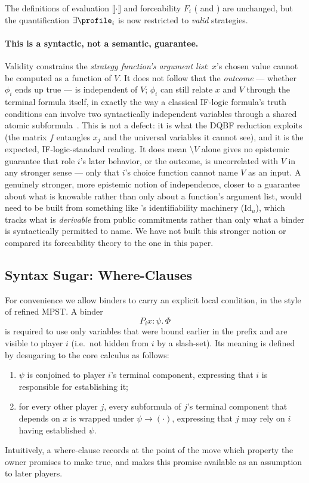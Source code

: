 The definitions of evaluation $\llbracket\cdot\rrbracket$ and forceability $F_i$
( and )
are unchanged, but the quantification $\exists \profile_i$
is now restricted to \emph{valid} strategies.

\paragraph{This is a syntactic, not a semantic, guarantee.}
Validity constrains the \emph{strategy function's argument list}: $x$'s
chosen value cannot be computed as a function of $V$. It does not follow
that the \emph{outcome} --- whether $\phi_i$ ends up true --- is independent
of $V$; $\phi_i$ can still relate $x$ and $V$ through the terminal formula
itself, in exactly the way a classical IF-logic formula's truth conditions
can involve two syntactically independent variables through a shared atomic
subformula~\cite{sep-logic-if}. This is not a defect: it is what the
 DQBF reduction exploits (the matrix $f$ entangles
$x_j$ and the universal variables it cannot see), and it is the expected,
IF-logic-standard reading. It does mean $\setminus V$ alone gives no
epistemic guarantee that role $i$'s later behavior, or the outcome, is
uncorrelated with $V$ in any stronger sense --- only that $i$'s choice
function cannot name $V$ as an input. A genuinely stronger, more
epistemic notion of independence, closer to a guarantee about what is
knowable rather than only about a function's argument list, would need to be
built from something like 's identifiability
machinery ($\mathrm{Id}_u$), which tracks what is \emph{derivable} from
public commitments rather than only what a binder is syntactically permitted
to name. We have not built this stronger notion or compared its forceability
theory to the one in this paper.

\subsection{Syntax Sugar: Where-Clauses}
\label{subsec:where}
For convenience we allow binders to carry an explicit local condition, in the
style of refined MPST. A binder
\[
  P_i x : \psi.\,\Phi
\]
is required to use only variables that were bound earlier in the prefix and are
visible to player $i$ (i.e.\ not hidden from $i$ by a slash-set). Its meaning is
defined by desugaring to the core calculus as follows:
\begin{enumerate}[nosep]
  \item $\psi$ is conjoined to player $i$'s terminal component, expressing that
        $i$ is responsible for establishing it;
  \item for every other player $j$, every subformula of $j$'s terminal component
        that depends on $x$ is wrapped under $\psi \rightarrow (\cdot)$,
        expressing that $j$ may rely on $i$ having established $\psi$.
\end{enumerate}
Intuitively, a where-clause records at the point of the move which property the
owner promises to make true, and makes this promise available as an assumption
to later players.

